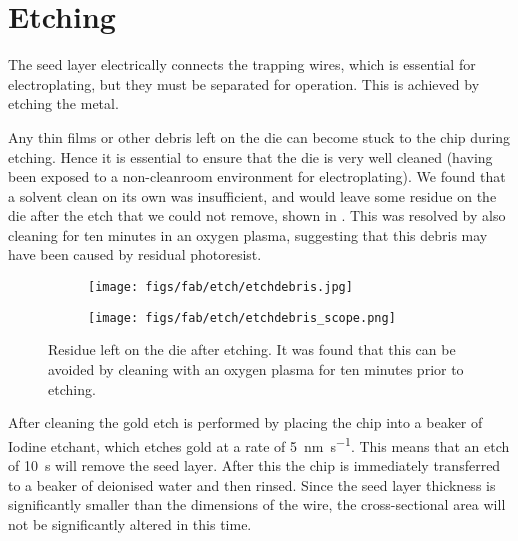 \section{Etching}

The seed layer electrically connects the trapping wires, which is
essential for electroplating, but they must be separated for operation. This is
achieved by etching the metal.

Any thin films or other debris left on the die can become stuck to the chip
during etching. \cite{} Hence it is essential to ensure that the die is very
well cleaned (having been exposed to a non-cleanroom environment for
electroplating). We found that a solvent clean on its own was insufficient,
and would leave some residue on the die after the etch that we could not
remove, shown in . This was resolved by also cleaning
for ten minutes in an oxygen plasma, suggesting that this debris may have been
caused by residual photoresist.

\begin{figure}
  \centering
  \begin{subfigure}[b]{0.45\textwidth}
    \texttt{[image: figs/fab/etch/etchdebris.jpg]}
    \caption{}
  \end{subfigure}
  \hspace{1cm}
  \begin{subfigure}[b]{0.45\textwidth}
    \centering
    \texttt{[image: figs/fab/etch/etchdebris\_scope.png]}
    \caption{}
  \end{subfigure}
  \caption{Residue left on the die after etching. It was found that this can be
  avoided by cleaning with an oxygen plasma for ten minutes prior to etching.}
  \label{fab:fig:etchres}
\end{figure}

%
After cleaning the gold etch is performed by placing the chip into a beaker of
Iodine etchant, which etches gold at a rate of \SI{5}{\nano\meter\per\second}.
This means that an etch of \SI{10}{\second} will remove the seed layer. After
this the chip is immediately transferred to a beaker of deionised water and
then rinsed. Since the seed layer thickness is significantly smaller than the
dimensions of the wire, the cross-sectional area will not be significantly
altered in this time.

